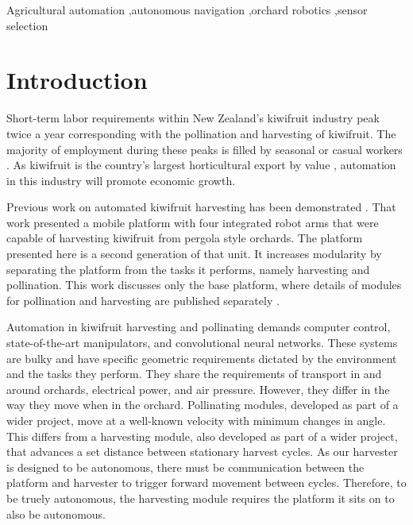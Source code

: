 \documentclass[preprint,authoryear,12pt]{elsarticle}
\begin{document}
\begin{frontmatter}
\begin{keyword}

    Agricultural automation \sep autonomous navigation \sep orchard robotics \sep sensor selection
\end{keyword}

\end{frontmatter}


\section{Introduction}
\label{sect:intro}
    Short-term labor requirements within New Zealand's kiwifruit industry peak twice a year corresponding with the pollination and harvesting of kiwifruit.
    The majority of employment during these peaks is filled by seasonal or casual workers \citep{Timmins2009}.
    As kiwifruit is the country's largest horticultural export by value \citep{StatisticsNewZealand2015}, automation in this industry will promote economic growth.

    Previous work on automated kiwifruit harvesting has been demonstrated \citep{Scarfe2012}.
    That work presented a mobile platform with four integrated robot arms that were capable of harvesting kiwifruit from pergola style orchards.
    The platform presented here is a second generation of that unit.
    It increases modularity by separating the platform from the tasks it performs, namely harvesting and pollination.
    This work discusses only the base platform, where details of modules for pollination and harvesting are published separately \citep{williams2017,Seabright2017}.

    Automation in kiwifruit harvesting and pollinating demands computer control, state-of-the-art manipulators, and convolutional neural networks.
    These systems are bulky and have specific geometric requirements dictated by the environment and the tasks they perform.
    They share the requirements of transport in and around orchards, electrical power, and air pressure.
    However, they differ in the way they move when in the orchard.
    Pollinating modules, developed as part of a wider project, move at a well-known velocity with minimum changes in angle.
    This differs from a harvesting module, also developed as part of a wider project, that advances a set distance between stationary harvest cycles.
    As our harvester is designed to be autonomous, there must be communication between the platform and harvester to trigger forward movement between cycles.
    Therefore, to be truely autonomous, the harvesting module requires the platform it sits on to also be autonomous.
\end{document}
